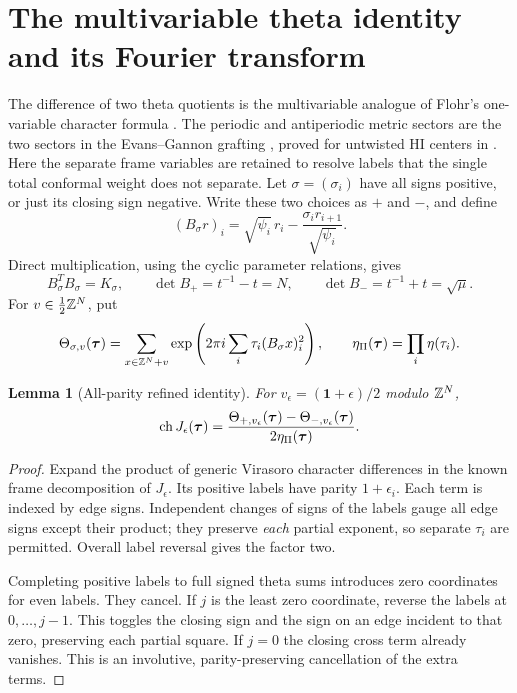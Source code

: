 \documentclass[11pt,a4paper]{article}
\numberwithin{equation}{section}
\newtheorem{lemma}[theorem]{Lemma}
\theoremstyle{definition}\newtheorem{definition}[theorem]{Definition}
\theoremstyle{remark}\newtheorem{remark}[theorem]{Remark}
\newcommand{\one}{\mathbf1}\newcommand{\B}{\mathcal B}\newcommand{\W}{W_N}
\begin{document}
\section{The multivariable theta identity and its Fourier transform}
\label{v2:theta}
\label{g:sec:theta}
The difference of two theta quotients is the multivariable analogue
of Flohr's one-variable character formula
\cite[equations (4.2)--(4.5) and Table 4.2]{flohr1993}.
The periodic and antiperiodic metric sectors are the two sectors
in the Evans--Gannon grafting \cite[Section 3.3]{evansgannon2011},
proved for untwisted HI centers in \cite[Theorem 5.1]{gsy}.
Here the separate frame variables are retained to resolve labels
that the single total conformal weight does not separate.
Let $\sigma=(\sigma_i)$ have all signs positive, or just its closing
sign negative. Write these two choices as $+$ and $-$, and define
\[
 (B_\sigma r)_i=\sqrt{\psi_i}\,r_i
                  -\frac{\sigma_i r_{i+1}}{\sqrt{\psi_i}}.
\]
Direct multiplication, using the cyclic parameter relations,
gives
\[
 B_\sigma^TB_\sigma=K_\sigma,\qquad
 \det B_+=t^{-1}-t=N,\qquad
 \det B_-=t^{-1}+t=\sqrt\mu.
\]
For $v\in\frac12\mathbb Z^N$, put
\[
 \Theta_{\sigma,v}(\boldsymbol\tau)
 =\sum_{x\in\mathbb Z^N+v}
       \exp\left(2\pi i\sum_i\tau_i(B_\sigma x)_i^2\right),
 \qquad
 \eta_\Pi(\boldsymbol\tau)=\prod_i\eta(\tau_i).
\]

\begin{lemma}[All-parity refined identity]\label{g:lem:theta}
For $v_\epsilon=(\one+\epsilon)/2$ modulo $\mathbb Z^N$,
\[
 \operatorname{ch} J_\epsilon(\boldsymbol\tau)
   =\frac{\Theta_{+,v_\epsilon}(\boldsymbol\tau)
                  -\Theta_{-,v_\epsilon}(\boldsymbol\tau)}
                  {2\eta_\Pi(\boldsymbol\tau)}.
\]
\end{lemma}
\begin{proof}
Expand the product of generic Virasoro character differences in the
known frame decomposition of $J_\epsilon$. Its positive labels have
parity $1+\epsilon_i$. Each term is indexed by edge signs. Independent
changes of signs of the labels gauge all edge signs except their
product; they preserve \emph{each} partial exponent, so separate
$\tau_i$ are permitted. Overall label reversal gives the factor two.

Completing positive labels to full signed theta sums introduces zero
coordinates for even labels. They cancel. If $j$ is the least zero
coordinate, reverse the labels at $0,\ldots,j-1$. This toggles the
closing sign and the sign on an edge incident to that zero, preserving
each partial square. If $j=0$ the closing cross term already vanishes.
This is an involutive, parity-preserving cancellation of the extra
terms.
\end{proof}
\end{document}
